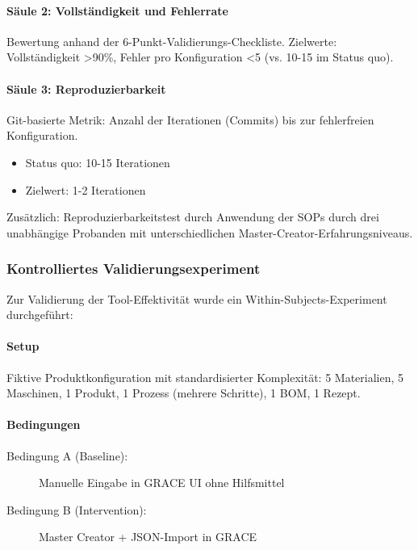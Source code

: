 \paragraph{Säule 2: Vollständigkeit und Fehlerrate}

Bewertung anhand der 6-Punkt-Validierungs-Checkliste. Zielwerte: Vollständigkeit >90\%, Fehler pro Konfiguration <5 (vs. 10-15 im Status quo).

\paragraph{Säule 3: Reproduzierbarkeit}

Git-basierte Metrik: Anzahl der Iterationen (Commits) bis zur fehlerfreien Konfiguration.
\begin{itemize}
    \item Status quo: 10-15 Iterationen
    \item Zielwert: 1-2 Iterationen
\end{itemize}

Zusätzlich: Reproduzierbarkeitstest durch Anwendung der SOPs durch drei unabhängige Probanden mit unterschiedlichen Master-Creator-Erfahrungsniveaus.

\subsubsection{Kontrolliertes Validierungsexperiment}
\label{subsubsec:Experiment}

Zur Validierung der Tool-Effektivität wurde ein Within-Subjects-Experiment durchgeführt:

\paragraph{Setup}
Fiktive Produktkonfiguration mit standardisierter Komplexität: 5 Materialien, 5 Maschinen, 1 Produkt, 1 Prozess (mehrere Schritte), 1 BOM, 1 Rezept.

\paragraph{Bedingungen}
\begin{description}
    \item[Bedingung A (Baseline):] Manuelle Eingabe in GRACE UI ohne Hilfsmittel
    \item[Bedingung B (Intervention):] Master Creator + JSON-Import in GRACE
\end{description}

